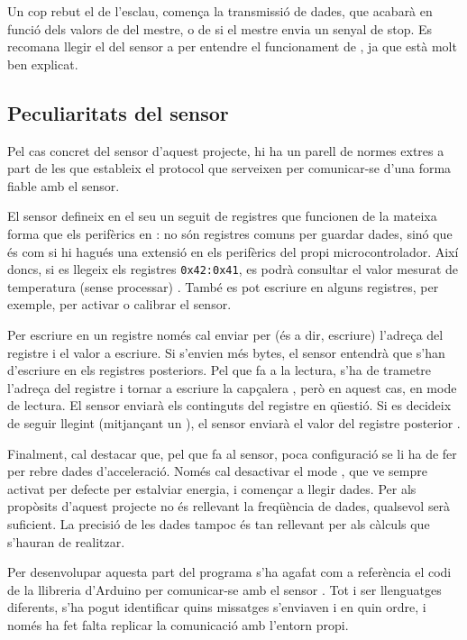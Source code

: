 Un cop rebut el  de l'esclau, comença la transmissió de
dades, que acabarà en funció dels valors de  del mestre, o
de si el mestre envia un senyal de stop. Es recomana llegir el  del
sensor a \cite{mpu6050specs} per entendre el funcionament de ,
ja que està molt ben explicat.

\subsection{Peculiaritats del sensor }
\label{subsec:i2c_sensor}

Pel cas concret del sensor d'aquest projecte, hi ha un parell de normes extres
a part de les que estableix el protocol  que serveixen per comunicar-se
d'una forma fiable amb el sensor.

El sensor  defineix en el seu  un seguit de
registres que funcionen de la mateixa forma que els perifèrics en :
no són registres comuns per guardar dades, sinó que és com si hi hagués una
extensió en els perifèrics del propi microcontrolador. Així doncs, si es llegeix
els registres \texttt{0x42:0x41}, es podrà consultar el valor mesurat de temperatura
(sense processar) \cite{MPU6050reg}. També es pot escriure en alguns registres,
per exemple, per activar o calibrar el sensor.

Per escriure en un registre només cal enviar per  (és a dir, escriure)
l'adreça del registre i el valor a escriure. Si s'envien més bytes, el sensor
entendrà que s'han d'escriure en els registres posteriors. Pel que fa a la lectura,
s'ha de trametre l'adreça del registre i tornar a escriure la capçalera ,
però en aquest cas, en mode de lectura. El sensor enviarà els continguts del
registre en qüestió. Si es decideix de seguir llegint (mitjançant un ),
el sensor enviarà el valor del registre posterior \cite{mpu6050specs}.

Finalment, cal destacar que, pel que fa al sensor, poca configuració se li ha de
fer per rebre dades d'acceleració. Només cal desactivar el mode ,
que ve sempre activat per defecte per estalviar energia, i començar a llegir
dades. Per als propòsits d'aquest projecte no és rellevant la freqüència de
dades, qualsevol serà suficient. La precisió de les dades tampoc és tan rellevant
per als càlculs que s'hauran de realitzar.

Per desenvolupar aquesta part del programa s'ha agafat com a referència el
codi de la llibreria d'Arduino per comunicar-se amb el sensor
\cite{mpu6050ino}. Tot i ser llenguatges diferents, s'ha pogut identificar
quins missatges  s'enviaven i en quin ordre, i només ha fet falta
replicar la comunicació amb l'entorn propi.


